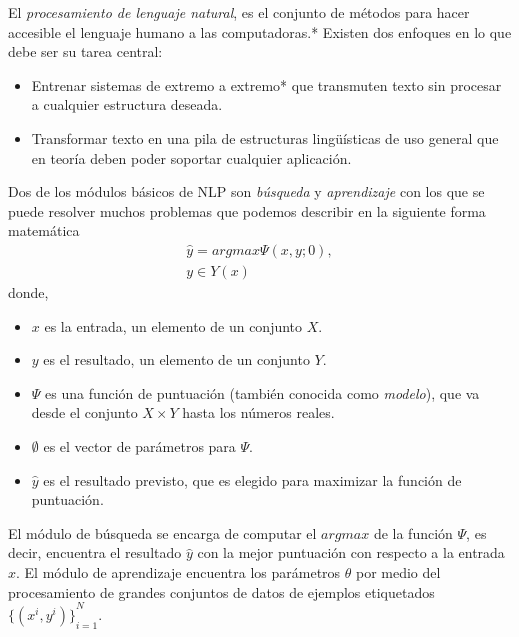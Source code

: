 El \emph{procesamiento de lenguaje natural}, es el conjunto de métodos para hacer accesible el lenguaje humano a las computadoras\cite{eise19}.* Existen dos enfoques en lo que debe ser su tarea central: 
\begin{itemize}
    \item Entrenar sistemas de extremo a extremo* que transmuten texto sin procesar a cualquier estructura deseada.
    \item Transformar texto en una pila de estructuras lingüísticas de uso general que en teoría deben poder soportar cualquier aplicación.
\end{itemize}
Dos de los módulos básicos de NLP son \emph{búsqueda} y \emph{aprendizaje} con los que se puede resolver muchos problemas que podemos describir en la siguiente forma matemática
\begin{equation}
\begin{matrix}
\hat{y}=argmax\Psi(x,y;0),\\
y\in Y(x)
\end{matrix}
\end{equation}
donde,
\begin{itemize}
    \item $x$ es la entrada, un elemento de un conjunto $X$.
    \item $y$ es el resultado, un elemento de un conjunto $Y$.
    \item $\Psi$ es una función de puntuación (también conocida como \emph{modelo}), que va desde el conjunto $X\times Y$ hasta los números reales.
    \item $\emptyset$ es el vector de parámetros para $\Psi$.
    \item $\hat{y}$ es el resultado previsto, que es elegido para maximizar la función de puntuación.
\end{itemize}
El módulo de búsqueda se encarga de computar el $argmax$ de la función $\Psi$, es decir, encuentra el resultado $\hat{y}$ con la mejor puntuación con respecto a la entrada $x$. El módulo de aprendizaje encuentra los parámetros $\theta$ por medio del procesamiento de grandes conjuntos de datos de ejemplos etiquetados ${\{(x^i,y^i)\}}_{i=1}^{N}$.